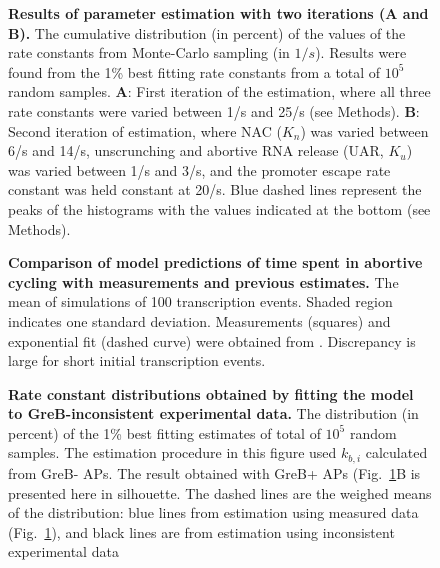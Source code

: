 \documentclass{bmcart}
\newcommand{\FIG}{{Fig.}}
\begin{document}
\begin{backmatter}
\begin{figure}[h!]
\begin{center}
    \end{center}
  \caption{{\bf Results of parameter estimation with two iterations (A and
      B).}
      The cumulative distribution (in percent) of the values of the rate
      constants from Monte-Carlo sampling (in
      $1/s$). Results were found from the 1\% best fitting rate constants
      from a total of $10^5$ random samples. \textbf{A}: First iteration of
      the estimation, where all three rate constants were varied between 1/s
      and 25/s (see Methods). \textbf{B}: Second iteration of estimation,
      where NAC ($K_n$) was varied between 6/s and 14/s, unscrunching and
      abortive RNA release (UAR, $K_u$) was varied between 1/s and 3/s, and
      the promoter escape rate constant was held constant at 20/s. Blue dashed
      lines represent the peaks of the histograms with the values
      indicated at the bottom (see Methods). }
      \label{fig:parameter_estimation_proper}
\end{figure}

\begin{figure}[h!]
    \begin{center}
    \end{center}
  \caption{{\bf Comparison of model predictions of time spent in abortive
  cycling with measurements and previous estimates.}
  The mean of simulations of 100 transcription events. Shaded region indicates
  one standard deviation. Measurements (squares) and exponential fit (dashed
  curve) were obtained from \cite{revyakin_abortive_2006}. Discrepancy is
  large for short initial transcription events.}
  \label{fig:revyakin_fit}
\end{figure}


\begin{figure}[h!]
    \begin{center}
    \end{center}
    \caption{
      {\bf Rate constant distributions obtained by fitting the model to
      GreB-inconsistent experimental data.}
      The distribution (in percent) of the 1\% best fitting estimates
      of total of $10^5$ random samples. The estimation procedure in this
      figure used $k_{b,i}$ calculated from GreB- APs. The result obtained
      with GreB+ APs (\FIG~\ref{fig:parameter_estimation_proper}B is presented here in
      silhouette. The dashed lines are the weighed means of the distribution:
      blue lines from estimation using measured data
      (\FIG~\ref{fig:parameter_estimation_proper}), and black
      lines are from estimation using inconsistent experimental data}
\label{fig:GreB_minus_fit}
\end{figure}


\end{backmatter}
\end{document}
